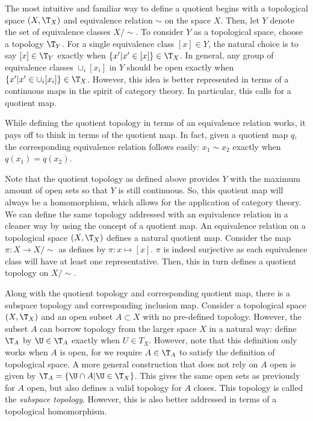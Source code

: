 The most intuitive and familiar way to define a quotient begins with a topological space $(X, \T_X)$ and equivalence relation $\sim$ on the space $X$. Then, let $Y$ denote the set of equivalence classes $X/\sim$. To consider $Y$ as a topological space, choose a topology $\T_Y$. For a single equivalence class $[x] \in Y$, the natural choice is to say $[x] \in \T_Y$ exactly when $\{ x' \vert x' \in [x] \} \in \T_X$. In general, any group of equivalence classes $\cup_i [x_i]$ in $Y$ should be open exactly when $\{x' \vert x' \in \cup_i [x_i] \} \in \T_X$. However, this idea is better represented in terms of a continuous maps in the spirit of category theory. In particular, this calls for a quotient map.

While defining the quotient topology in terms of an equivalence relation works, it pays off to think in terms of the quotient map. In fact, given a quotient map $q$, the corresponding equivalence relation follows easily: $x_1 \sim x_2$ exactly when $q(x_1) = q(x_2)$.

Note that the quotient topology as defined above provides $Y$ with the maximum amount of open sets so that $Y$ is still continuous. So, this quotient map will always be a homomorphism, which allows for the application of category theory.
We can define the same topology addressed with an equivalence relation in a cleaner way by using the concept of a quotient map. An equivalence relation on a topological space $(X, \T_X)$ defines a natural quotient map. Consider the map $\pi: X \to X/\sim$ as defines by $\pi: x \mapsto [x]$. $\pi$ is indeed surjective as each equivalence class will have at least one representative. Then, this in turn defines a quotient topology on $X/\sim$.

\begin{example}
\end{example}

Along with the quotient topology and corresponding quotient map, there is a subspace topology and corresponding inclusion map. Consider a topological space $(X,\T_X)$ and an open subset $A \subset X$ with no pre-defined topology. However, the subset $A$ can borrow topology from the larger space $X$ in a natural way: define $\T_A$ by $\U \in \T_A$ exactly when $U \in T_X$. However, note that this definition only works when $A$ is open, for we require $A \in \T_A$ to satisfy the definition of  topological space. A more general construction that does not rely on $A$ open is given by $\T_A = \{ \U \cap A \vert \U \in \T_X \}$. This gives the same open sets as previously for $A$ open, but also defines a valid topology for $A$ closes. This topology is called the \emph{subspace topology}. However, this is also better addressed in terms of a topological homomorphism.


